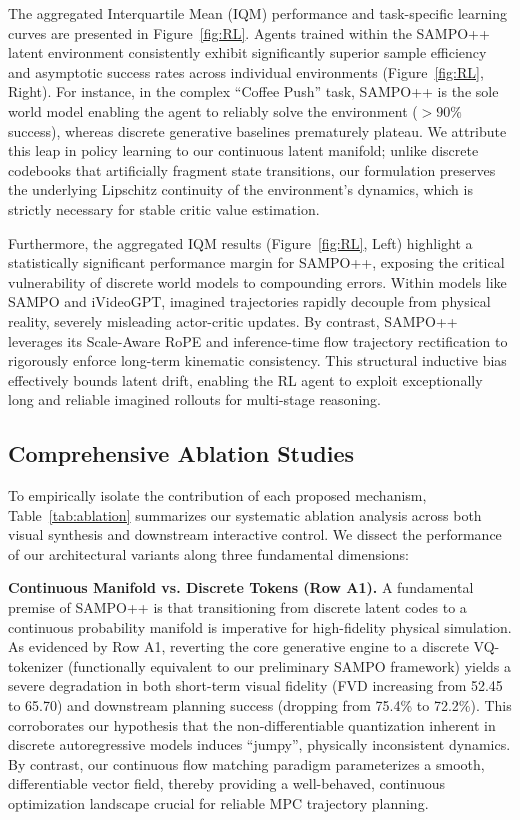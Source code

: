 The aggregated Interquartile Mean (IQM) performance and task-specific learning curves are presented in Figure~\ref{fig:RL}. Agents trained within the SAMPO++ latent environment consistently exhibit significantly superior sample efficiency and asymptotic success rates across individual environments (Figure~\ref{fig:RL}, Right). For instance, in the complex ``Coffee Push'' task, SAMPO++ is the sole world model enabling the agent to reliably solve the environment ($>90\%$ success), whereas discrete generative baselines prematurely plateau. We attribute this leap in policy learning to our continuous latent manifold; unlike discrete codebooks that artificially fragment state transitions, our formulation preserves the underlying Lipschitz continuity of the environment's dynamics, which is strictly necessary for stable critic value estimation.

Furthermore, the aggregated IQM results (Figure~\ref{fig:RL}, Left) highlight a statistically significant performance margin for SAMPO++, exposing the critical vulnerability of discrete world models to compounding errors. Within models like SAMPO and iVideoGPT, imagined trajectories rapidly decouple from physical reality, severely misleading actor-critic updates. By contrast, SAMPO++ leverages its Scale-Aware RoPE and inference-time flow trajectory rectification to rigorously enforce long-term kinematic consistency. This structural inductive bias effectively bounds latent drift, enabling the RL agent to exploit exceptionally long and reliable imagined rollouts for multi-stage reasoning.



\subsection{Comprehensive Ablation Studies}

To empirically isolate the contribution of each proposed mechanism, Table~\ref{tab:ablation} summarizes our systematic ablation analysis across both visual synthesis and downstream interactive control. We dissect the performance of our architectural variants along three fundamental dimensions:

\textbf{Continuous Manifold vs. Discrete Tokens (Row A1).} A fundamental premise of SAMPO++ is that transitioning from discrete latent codes to a continuous probability manifold is imperative for high-fidelity physical simulation. As evidenced by Row A1, reverting the core generative engine to a discrete VQ-tokenizer (functionally equivalent to our preliminary SAMPO framework) yields a severe degradation in both short-term visual fidelity (FVD increasing from 52.45 to 65.70) and downstream planning success (dropping from 75.4\% to 72.2\%). This corroborates our hypothesis that the non-differentiable quantization inherent in discrete autoregressive models induces ``jumpy'', physically inconsistent dynamics. By contrast, our continuous flow matching paradigm parameterizes a smooth, differentiable vector field, thereby providing a well-behaved, continuous optimization landscape crucial for reliable MPC trajectory planning. 

